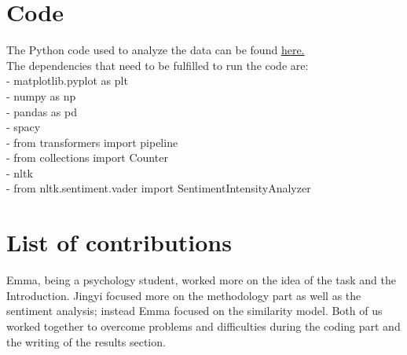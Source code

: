\section{Code}
The Python code used to analyze the data can be found \href{https://github.com/emmafranchino/nlp_assignments/blob/main/exercise_three/ex_three.ipynb}{here.}\\
The dependencies that need to be fulfilled to run the code are:\\
- matplotlib.pyplot as plt \\
- numpy as np \\
- pandas as pd \\
- spacy \\
- from transformers import pipeline \\
- from collections import Counter \\
- nltk \\
- from nltk.sentiment.vader import SentimentIntensityAnalyzer

\section*{List of contributions}
Emma, being a psychology student, worked more on the idea of the task and the Introduction. Jingyi focused more on the methodology part as well as the sentiment analysis; instead Emma focused on the similarity model. 
Both of us worked together to overcome problems and difficulties during the coding part and the writing of the results section. 